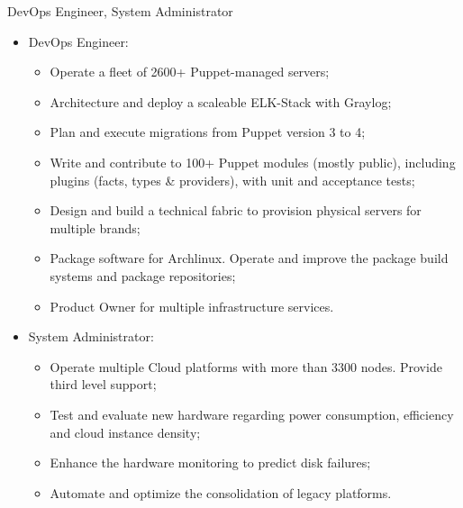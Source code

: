 %
  {DevOps Engineer, System Administrator
\begin{itemize}
  \item DevOps Engineer:
    \begin{itemize}
      \item Operate a fleet of 2600+ Puppet-managed servers;
      \item Architecture and deploy a scaleable ELK-Stack with Graylog;
      \item Plan and execute migrations from Puppet version 3 to 4;
      \item Write and contribute to 100+ Puppet modules (mostly public), including plugins (facts, types \& providers), with unit and acceptance tests;
      \item Design and build a technical fabric to provision physical servers for multiple brands;
      \item Package software for Archlinux. Operate and improve the package build systems and package repositories;
      \item Product Owner for multiple infrastructure services.
    \end{itemize}
  \item System Administrator:
    \begin{itemize}
      \item Operate multiple Cloud platforms with more than 3300 nodes. Provide third level support;
      \item Test and evaluate new hardware regarding power consumption, efficiency and cloud instance density;
      \item Enhance the hardware monitoring to predict disk failures;
      \item Automate and optimize the consolidation of legacy platforms.
    \end{itemize}
\end{itemize}}

